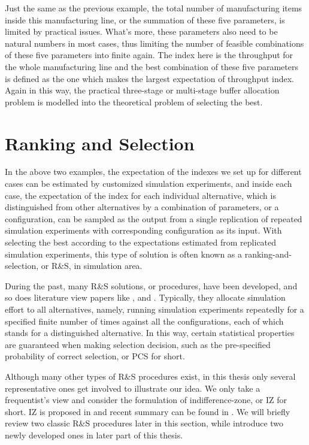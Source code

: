 \documentclass[12pt,a4paper]{report}
\begin{document}
Just the same as the previous example, the total number of manufacturing items inside this manufacturing line, or the summation of these five parameters, is limited by practical issues. What's more, these parameters also need to be natural numbers in most cases, thus limiting the number of feasible combinations of these five parameters into finite again. The index here is the throughput for the whole manufacturing line and the best combination of these five parameters is defined as the one which makes the largest expectation of throughput index. Again in this way, the practical three-stage or multi-stage buffer allocation problem is modelled into the theoretical problem of selecting the best.

\section{Ranking and Selection}

In the above two examples, the expectation of the indexes we set up for different cases can be estimated by customized simulation experiments, and inside each case, the expectation of the index for each individual alternative, which is distinguished from other alternatives by a combination of parameters, or a configuration, can be sampled as the output from a single replication of repeated simulation experiments with corresponding configuration as its input. With selecting the best according to the expectations estimated from replicated simulation experiments, this type of solution is often known as a ranking-and-selection, or R\&S, in simulation area.

During the past, many R\&S solutions, or procedures, have been developed, and so does literature view papers like \cite{ras-recent-advances}, \cite{ehiorams06ras} and \cite{ms05ras}. Typically, they allocate simulation effort to all alternatives, namely, running simulation experiments repeatedly for a specified finite number of times against all the configurations, each of which stands for a distinguished alternative. In this way, certain statistical properties are guaranteed when making selection decision, such as the pre-specified probability of correct selection, or PCS for short.

Although many other types of R\&S procedures exist, in this thesis only several representative ones get involved to illustrate our idea. We only take a frequentist’s view and consider the formulation of indifference-zone, or IZ for short. IZ is proposed in \cite{toams1954iz} and recent summary can be found in \cite{nyjws95iz}. We will briefly review two classic R\&S procedures later in this section, while introduce two newly developed ones in later part of this thesis.
\end{document}
